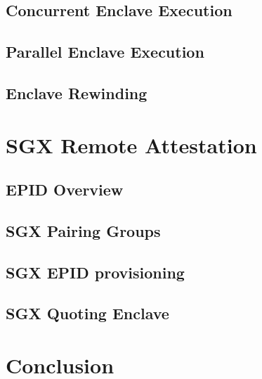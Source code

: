 \documentclass[10pt]{article}
\begin{document}
  \subsection{Concurrent Enclave Execution}
  \label{ssec:concexec}

  \subsection{Parallel Enclave Execution}
  \label{ssec:parallelexec}

  \subsection{Enclave Rewinding}
  \label{ssec:rewinding}

  \section{SGX Remote Attestation}
  \label{sec:remoteatt}

  \subsection{EPID Overview}
  \label{ssec:epid}

  \subsection{SGX Pairing Groups}
  \label{ssec:pairings}

  \subsection{SGX EPID provisioning}
  \label{ssec:epidprov}

  \subsection{SGX Quoting Enclave}
  \label{ssec:qe}

  \section{Conclusion}
  \label{sec:conclusion}



\end{document}
